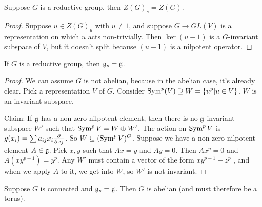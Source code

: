 \begin{lemma}
 Suppose $G$ is a reductive group, then $Z(G)_s=Z(G)$.
\end{lemma}
\begin{proof}
 Suppose $u\in Z(G)_u$ with $u\neq 1$, and suppose $G\to GL(V)$ is a representation on which $u$ acts non-trivially. Then $\ker(u-1)$ is a $G$-invariant subspace of $V$, but it doesn't split because $(u-1)$ is a nilpotent operator.
\end{proof}
\begin{proposition}
 If $G$ is a reductive group, then $\mathfrak{g}_s=\mathfrak{g}$.
\end{proposition}
\begin{proof}
 We can assume $G$ is not abelian, because in the abelian case, it's already clear. Pick a representation $V$ of $G$. Consider $\operatorname{Sym}^p(V)\supseteq W=\{u^p|u\in V\}$. $W$ is an invariant subspace.
 
 Claim: If $\mathfrak{g}$ has a non-zero nilpotent element, then there is no $\mathfrak{g}$-invariant subspace $W'$ such that $\operatorname{Sym}^p V=W\oplus W'$. The action on $\operatorname{Sym}^pV$ is $g(x_i)=\sum a_{ij} x_i\frac{\partial }{\partial x_j}$. So $W\subseteq (\operatorname{Sym}^p V)^G$. Suppose we have a non-zero nilpotent element $A\in \mathfrak{g}$. Pick $x,y$ such that $Ax=y$ and $Ay=0$. Then $Ax^p=0$ and $A(xy^{p-1})=y^p$. Any $W'$ must contain a vector of the form $xy^{p-1}+z^p$ , and when we apply $A$ to it, we get into $W$, so $W'$ is not invariant.
\end{proof}
\begin{proposition}
 Suppose $G$ is connected and $\mathfrak{g}_s=\mathfrak{g}$. Then $G$ is abelian (and must therefore be a torus).
\end{proposition}
